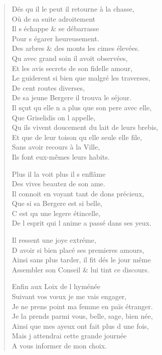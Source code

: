\begin{verse}
\vin Dés qu\textquotesingle{} il le peut il retourne à la chasse, \\
\vin Où de sa suite adroitement \\
\vin Il s\textquotesingle{} échappe \& se débarrasse \\
\vin Pour s\textquotesingle{} égarer heureusement. \\
Des arbres \& des monts les cimes élevées. \\
\vin Qu\textquotesingle{} avec grand soin il avoit observées, \\
Et les avis secrets de son fidelle amour, \\
Le guiderent si bien que malgré les traverses, \\
\vin\vin De cent routes diverses, \\
De sa jeune Bergere il trouva le séjour. \\
Il sçut qu\textquotesingle{} elle n\textquotesingle{} a plus que son pere avec elle, \\
\vin Que Griselidis on l\textquotesingle{} appelle, \\
Qu\textquotesingle{} ils vivent doucement du lait de leurs brebis, \\
Et que de leur toison qu\textquotesingle{} elle seule elle file, \\
\vin Sans avoir recours à la Ville, \\
\vin Ils font eux-mêmes leurs habits.

\vin Plus il la voit plus il s\textquotesingle{} enflâme \\
\vin Des vives beautez de son ame. \\
Il connoit en voyant tant de dons précieux, \\
\vin Que si sa Bergere est si belle, \\
\vin C\textquotesingle{} est qu\textquotesingle{} une legere étincelle, \\
De l\textquotesingle{} esprit qui l\textquotesingle{} anime a passé dans ses yeux.

\vin Il ressent une joye extréme, \\
D\textquotesingle{} avoir si bien placé ses premieres amours, \\
Ainsi sans plus tarder, il fit dés le jour même \\
Assembler son Conseil \& lui tint ce discours.

\vin Enfin aux Loix de l\textquotesingle{} hyménée \\
\vin Suivant vos vœux je me vais engager, \\
Je ne prens point ma femme en païs étranger. \\
Je la prends parmi vous, belle, sage, bien née, \\
Ainsi que mes ayeux  ont fait plus d\textquotesingle{} une fois, \\
\vin Mais j\textquotesingle{} attendrai cette grande journée \\
\vin A vous informer de mon choix.


\end{verse}

